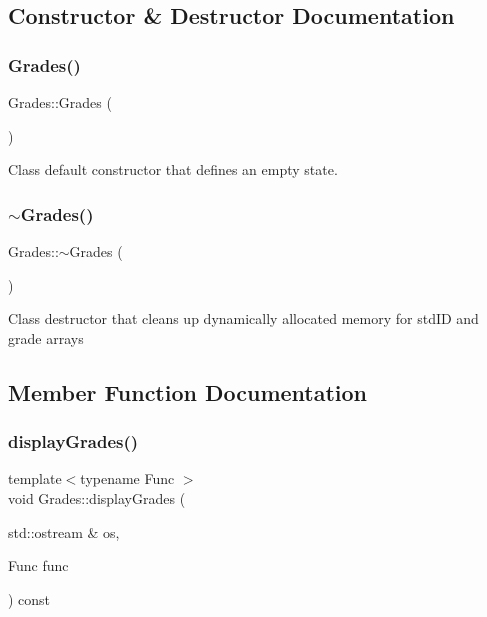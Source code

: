 \subsection{Constructor \& Destructor Documentation}
\mbox{\label{classGrades_a2bbc5a8c929c273e62fe6a8b442ad0db}} 
\subsubsection{\texorpdfstring{Grades()}{Grades()}}
{\footnotesize\ttfamily Grades\+::\+Grades (\begin{DoxyParamCaption}{ }\end{DoxyParamCaption})}

Class default constructor that defines an empty state. \mbox{\label{classGrades_a2838d5659c59892f54fa2d674cb68597}} 
\subsubsection{\texorpdfstring{$\sim$\+Grades()}{~Grades()}}
{\footnotesize\ttfamily Grades\+::$\sim$\+Grades (\begin{DoxyParamCaption}{ }\end{DoxyParamCaption})}

Class destructor that cleans up dynamically allocated memory for std\+ID and grade arrays 

\subsection{Member Function Documentation}
\mbox{\label{classGrades_a21957de7c89d7e51ef85b9d41d1264ef}} 
\subsubsection{\texorpdfstring{display\+Grades()}{displayGrades()}}
{\footnotesize\ttfamily template$<$typename Func $>$ \\
void Grades\+::display\+Grades (\begin{DoxyParamCaption}\item[{std\+::ostream \&}]{os,  }\item[{Func}]{func }\end{DoxyParamCaption}) const\hspace{0.3cm}{\ttfamily [inline]}}

